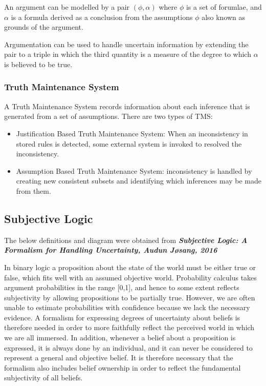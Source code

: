 \documentclass[UTF8]{article}
\newcommand{\mycite}[1]{\textbf{\textit{#1}}}
\begin{document}
An argument can be modelled by a pair $(\phi, \alpha)$ where $\phi$ is a set of forumlae, and $\alpha$ is a formula derived as a conclusion from the assumptions $\phi$ also known as grounds of the argument.

Argumentation can be used to handle uncertain information by extending the pair to a triple in which the third quantity is a measure of the degree to which $\alpha$ is believed to be true.

\subsubsection{Truth Maintenance System}
A Truth Maintenance System records information about each inference that is generated from a set of assumptions. There are two types of TMS:
\begin{itemize}
    \item Justification Based Truth Maintenance System: When an inconsistency in stored rules is detected, some external system is invoked to resolved the inconsistency.
    \item Assumption Based Truth Maintenance System: inconsistency is handled by creating new consistent subsets and identifying which inferences may be made from them.
\end{itemize}
\subsection{Subjective Logic}
The below definitions and diagram were obtained from \mycite{Subjective Logic: A Formalism for Handling Uncertainty, Audun Jøsang, 2016}

In binary logic a proposition about the state of the world must be either true or
false, which fits well with an assumed objective world. Probability calculus takes
argument probabilities in the range [0,1], and hence to some extent reflects subjectivity by allowing propositions to be partially true. However, we are often unable to
estimate probabilities with confidence because we lack the necessary evidence. A
formalism for expressing degrees of uncertainty about beliefs is therefore needed in
order to more faithfully reflect the perceived world in which we are all immersed.
In addition, whenever a belief about a proposition is expressed, it is always done by
an individual, and it can never be considered to represent a general and objective
belief. It is therefore necessary that the formalism also includes belief ownership in
order to reflect the fundamental subjectivity of all beliefs.
\end{document}
